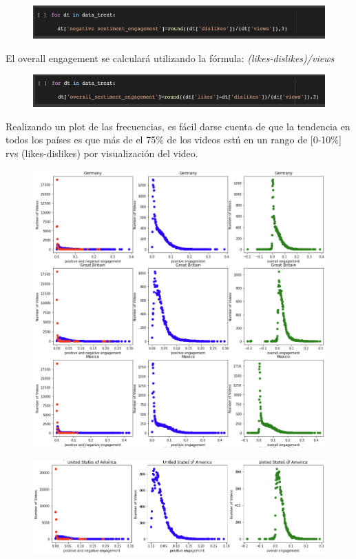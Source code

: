 \documentclass[a4paper,12pt]{article}
\begin{document}
\begin{figure}[h!]
\centering
\includegraphics[width=13cm]{neg_eng_gen.png}
\end{figure}

El overall engagement se calcular\'a utilizando la f\'ormula: {\itshape (likes-dislikes)/views}

\begin{figure}[h!]
\centering
\includegraphics[width=13cm]{ove_eng_gen.png}
\end{figure}

Realizando un plot de las frecuencias, es f\'acil darse cuenta de que la tendencia en todos los pa\'ises es que m\'as de el 75\% de los videos est\'n en un rango de [0-10\%] rvs (likes-dislikes) por visualizaci\'on del video.

\begin{figure}[h!]
\centering
\includegraphics[width=13cm]{engagement_1.png}
\end{figure}

\begin{figure}[h!]
\centering
\includegraphics[width=13cm]{engagement_2.png}
\end{figure}
\end{document}
